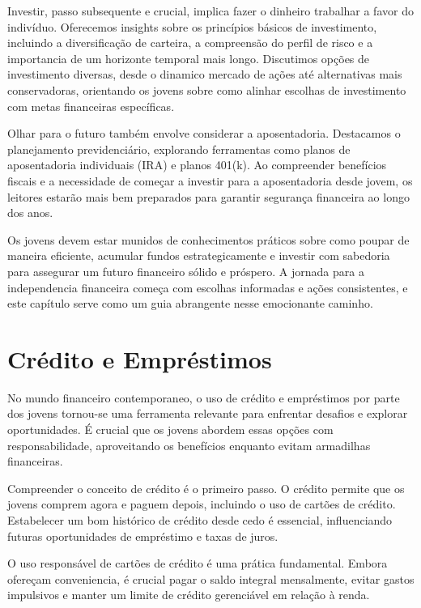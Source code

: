 \documentclass{report}
\begin{document}
Investir, passo subsequente e crucial, implica fazer o dinheiro trabalhar a favor do indivíduo. Oferecemos insights sobre os princípios básicos de investimento, incluindo a diversificação de carteira, a compreensão do perfil de risco e a importancia de um horizonte temporal mais longo. Discutimos opções de investimento diversas, desde o dinamico mercado de ações até alternativas mais conservadoras, orientando os jovens sobre como alinhar escolhas de investimento com metas financeiras específicas.

Olhar para o futuro também envolve considerar a aposentadoria. Destacamos o planejamento previdenciário, explorando ferramentas como planos de aposentadoria individuais (IRA) e planos 401(k). Ao compreender benefícios fiscais e a necessidade de começar a investir para a aposentadoria desde jovem, os leitores estarão mais bem preparados para garantir segurança financeira ao longo dos anos.

Os jovens devem estar munidos de conhecimentos práticos sobre como poupar de maneira eficiente, acumular fundos estrategicamente e investir com sabedoria para assegurar um futuro financeiro sólido e próspero. A jornada para a independencia financeira começa com escolhas informadas e ações consistentes, e este capítulo serve como um guia abrangente nesse emocionante caminho.

\section{Crédito e Empréstimos}
\label{sec:Crédito e Empréstimos}

No mundo financeiro contemporaneo, o uso de crédito e empréstimos por parte dos jovens tornou-se uma ferramenta relevante para enfrentar desafios e explorar oportunidades. É crucial que os jovens abordem essas opções com responsabilidade, aproveitando os benefícios enquanto evitam armadilhas financeiras.

Compreender o conceito de crédito é o primeiro passo. O crédito permite que os jovens comprem agora e paguem depois, incluindo o uso de cartões de crédito. Estabelecer um bom histórico de crédito desde cedo é essencial, influenciando futuras oportunidades de empréstimo e taxas de juros.

O uso responsável de cartões de crédito é uma prática fundamental. Embora ofereçam conveniencia, é crucial pagar o saldo integral mensalmente, evitar gastos impulsivos e manter um limite de crédito gerenciável em relação à renda.
\end{document}
